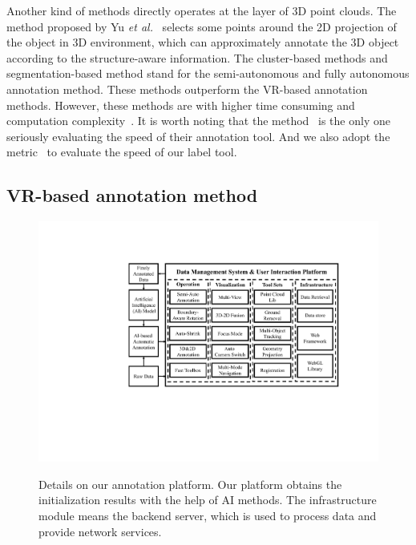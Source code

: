 \documentclass[letterpaper, 10 pt, conference]{ieeeconf}  %
\begin{document}
Another kind of methods directly operates at the layer of 3D point clouds.
The method proposed by Yu \textit{et al.}~\cite{yu2012efficient} selects some points around the 2D projection of the object in 3D environment, which can approximately annotate the 3D object according to the structure-aware information. The cluster-based methods and segmentation-based method stand for the semi-autonomous and fully autonomous annotation method.
These methods outperform the VR-based annotation methods. However, these methods are with higher time consuming and computation complexity~\cite{pointatme}. It is worth noting that the method~\cite{monica2017multi} is the only one seriously evaluating the speed of their annotation tool. And we also adopt the metric~\cite{monica2017multi} to evaluate the speed of our label tool.
\subsection{VR-based annotation method}
\begin{figure}[htp]
 \centering
   \vspace{-0.1cm}
 \includegraphics[width=1.0\linewidth]{./figures/system-modules}\\ %
  \caption{Details on our annotation platform. Our platform obtains the initialization results with the help of AI methods. The infrastructure module means the backend server, which is used to process data and provide network services.}
     \label{fig:main_ui}
     \vspace{-0.3cm}
\end{figure}
\end{document}
